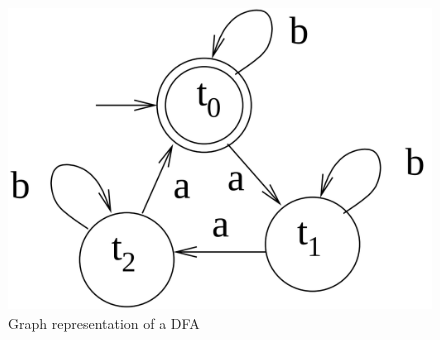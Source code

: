 \begin{figure}
\begin{center}
  \includegraphics[scale=0.17]{./images/CA_FDM/amod3Automata}
  \caption{Graph representation of a DFA}
  \label{amod3Automata}
\end{center}
\end{figure}
\FloatBarrier


